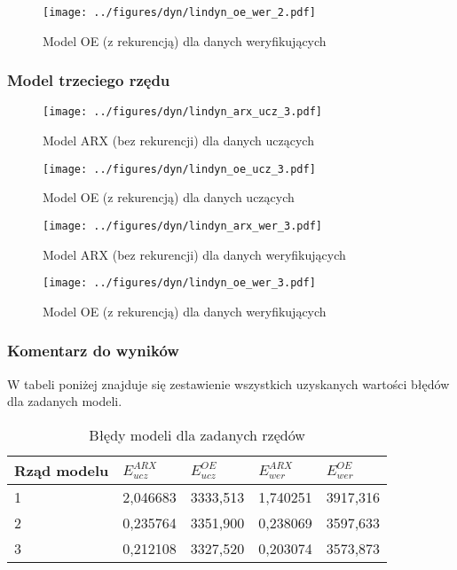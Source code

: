 \documentclass[a4paper,titlepage,11pt,floatssmall]{mwrep}
\begin{document}
\begin{figure}[H]
\centering
\texttt{[image: ../figures/dyn/lindyn\_oe\_wer\_2.pdf]}
\caption{Model OE (z rekurencją) dla danych weryfikujących}
\end{figure}

\subsubsection{Model trzeciego rzędu}

\begin{figure}[H]
\centering
\texttt{[image: ../figures/dyn/lindyn\_arx\_ucz\_3.pdf]}
\caption{Model ARX (bez rekurencji) dla danych uczących}
\end{figure}

\begin{figure}[H]
\centering
\texttt{[image: ../figures/dyn/lindyn\_oe\_ucz\_3.pdf]}
\caption{Model OE (z rekurencją) dla danych uczących}
\end{figure}

\begin{figure}[H]
\centering
\texttt{[image: ../figures/dyn/lindyn\_arx\_wer\_3.pdf]}
\caption{Model ARX (bez rekurencji) dla danych weryfikujących}
\end{figure}

\begin{figure}[H]
\centering
\texttt{[image: ../figures/dyn/lindyn\_oe\_wer\_3.pdf]}
\caption{Model OE (z rekurencją) dla danych weryfikujących}
\end{figure}

\subsubsection{Komentarz do wyników}
W tabeli poniżej znajduje się zestawienie wszystkich uzyskanych wartości błędów dla zadanych modeli.


\begin{table}[H]
\centering
\caption{Błędy modeli dla zadanych rzędów}
\begin{tabular}{|l|l|l|l|l|}
\hline
Rząd modelu &$ E_{ucz}^{ARX}$     & $E_{ucz}^{OE}$    & $E_{wer}^{ARX}$     &$ E_{wer}^{OE} $    \\ \hline
1           & 2,046683 & 3333,513 & 1,740251 & 3917,316 \\ \hline
2           & 0,235764 & 3351,900 & 0,238069 & 3597,633 \\ \hline
3           & 0,212108 & 3327,520 & 0,203074 & 3573,873 \\ \hline
\end{tabular}
\end{table}
\end{document}
